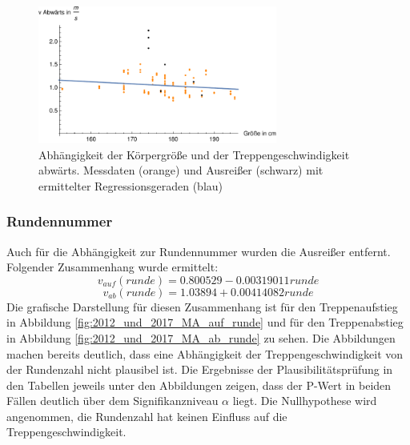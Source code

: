 \begin{figure}[htpb]
	\centering
	\includegraphics[width=0.7\textwidth]{abbildungen/regression/2012_2017_verbund/ohneausreisser/ab-groesse.pdf}
	
	\caption{Abhängigkeit der Körpergröße und der Treppengeschwindigkeit abwärts. Messdaten (orange) und Ausreißer (schwarz) mit ermittelter Regressionsgeraden (blau)}
	\label{fig:2012_und_2017_MA_ab_groesse}
\end{figure}

\subsubsection{Rundennummer}
Auch für die Abhängigkeit zur Rundennummer wurden die Ausreißer entfernt. Folgender Zusammenhang wurde ermittelt:
\begin{equation}
v_{auf}(runde) = 0.800529 -0.00319011 runde
\label{eq:2012_2017_AufRunde_MA}
\end{equation}
\begin{equation}
v_{ab}(runde) = 1.03894 + 0.00414082 runde
\label{eq:2012_2017_AbRunde_MA}
\end{equation}
Die grafische Darstellung für diesen Zusammenhang ist für den Treppenaufstieg in Abbildung \ref{fig:2012_und_2017_MA_auf_runde} und für den Treppenabstieg in Abbildung \ref{fig:2012_und_2017_MA_ab_runde} zu sehen. Die Abbildungen machen bereits deutlich, dass eine Abhängigkeit der Treppengeschwindigkeit von der Rundenzahl nicht plausibel ist. Die Ergebnisse der Plausibilitätsprüfung in den Tabellen jeweils unter den Abbildungen zeigen, dass der P-Wert in beiden Fällen deutlich über dem Signifikanzniveau $\alpha$ liegt. Die Nullhypothese wird angenommen, die Rundenzahl hat keinen Einfluss auf die Treppengeschwindigkeit.

